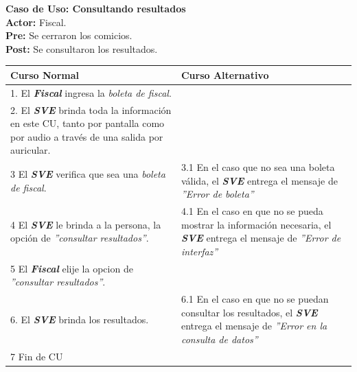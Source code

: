 \documentclass[spanish, 10pt,a4paper]{article}
\numberwithin{equation}{section} %
\begin{document}
\newpage
\noindent\textbf{Caso de Uso: Consultando resultados}\\
\textbf{Actor: } Fiscal.\\
\textbf{Pre: } Se cerraron los comicios.\\
\textbf{Post: } Se consultaron los resultados.\\
\begin{table}[H]
  \centering
\bgroup
\def\arraystretch{1.3}
  \begin{tabular}{p{9cm} | p{7cm}}
    \hline
    Curso Normal & Curso Alternativo \\
    \hline
    \hline    
    1. El \textbf{\textit{Fiscal}} ingresa la \textit{boleta de fiscal}. 
    & \\
    
    \hline
    2. El \textbf{\textit{SVE}} brinda toda la información en este CU, tanto por pantalla como por audio a través de una salida por auricular.
    &
    \\
    
    \hline
    3 El \textbf{\textit{SVE}} verifica que sea una \textit{boleta de fiscal}.
    & 
    3.1 En el caso que no sea una boleta válida, el \textbf{\textit{SVE}} entrega el mensaje de \textit{''Error de boleta''}
    \\
    
    \hline
    4 El \textbf{\textit{SVE}} le brinda a la persona, la opción de \textit{''consultar resultados''}.
    & 
    4.1 En el caso en que no se pueda mostrar la información necesaria, el \textbf{\textit{SVE}} entrega el mensaje de \textit{''Error de interfaz''}
    \\
    
    \hline
    5 El \textbf{\textit{Fiscal}} elije la opcion de \textit{''consultar resultados''}.
    & \\
    
    \hline
    6. El \textbf{\textit{SVE}} brinda los resultados.
    &
    6.1 En el caso en que no se puedan consultar los resultados, el \textbf{\textit{SVE}} entrega el mensaje de \textit{''Error en la consulta de datos''}
    \\
    
    \hline
    7 Fin de CU
    & \\
    \hline
  \end{tabular}
\egroup
\end{table}
\end{document}
